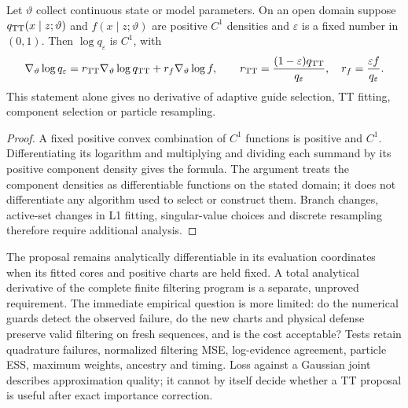 \begin{proposition}
\label{prop:robust-smoothness}
Let $\vartheta$ collect continuous state or model parameters. On an open
domain suppose $q_{\rm TT}(x\mid z;\vartheta)$ and
$f(x\mid z;\vartheta)$ are positive $C^1$ densities and $\varepsilon$
is a fixed number in $(0,1)$. Then $\log q_\varepsilon$ is $C^1$, with
\begin{equation}
 \nabla_\vartheta\log q_\varepsilon
 =r_{\rm TT}\nabla_\vartheta\log q_{\rm TT}
   +r_f\nabla_\vartheta\log f,\qquad
 r_{\rm TT}=\frac{(1-\varepsilon)q_{\rm TT}}{q_\varepsilon},
 \quad r_f=\frac{\varepsilon f}{q_\varepsilon}.
 \label{eq:robust-mixture-score}
\end{equation}
This statement alone gives no derivative of adaptive guide selection,
TT fitting, component selection or particle resampling.
\end{proposition}
\begin{proof}
A fixed positive convex combination of $C^1$ functions is positive and
$C^1$. Differentiating its logarithm and multiplying and dividing each
summand by its positive component density gives the formula. The argument
treats the component densities as differentiable functions on the stated
domain; it does not differentiate any algorithm used to select or construct
them. Branch changes, active-set changes in L1 fitting, singular-value
choices and discrete resampling therefore require additional analysis.
\end{proof}

The proposal remains analytically differentiable in its evaluation
coordinates when its fitted cores and positive charts are held fixed. A
total analytical derivative of the complete finite filtering program is a
separate, unproved requirement. The immediate empirical question is more
limited: do the numerical guards detect the observed failure, do the new
charts and physical defense preserve valid filtering on fresh sequences,
and is the cost acceptable? Tests retain quadrature failures, normalized
filtering MSE, log-evidence agreement, particle ESS, maximum weights,
ancestry and timing. Loss against a Gaussian joint describes approximation
quality; it cannot by itself decide whether a TT proposal is useful after
exact importance correction.

